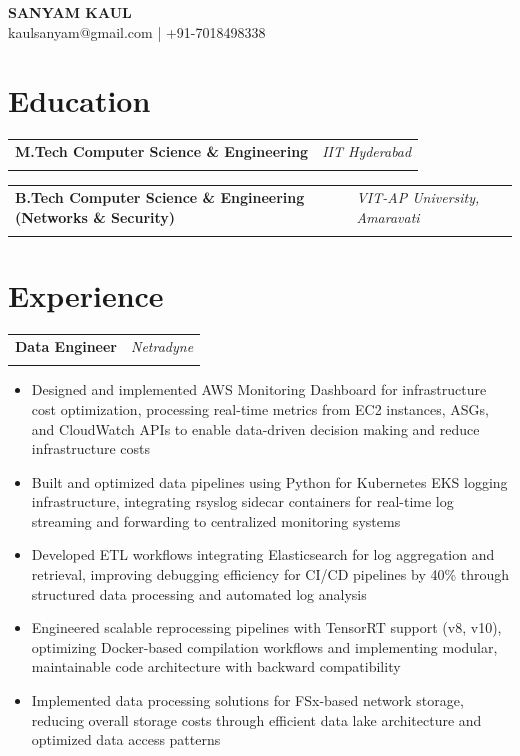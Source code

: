 \documentclass[11pt,a4paper]{article}
\makeatletter
\newcommand{\resumeItem}[1]{\item\small{#1}}
\newlength{\resumeLeftCol}
\newlength{\resumeRightCol}
\newcommand{\resumeHeading}[4]{
  \begin{tabular*}{\textwidth}{@{}p{\resumeLeftCol}@{\extracolsep{\fill}}>{\raggedleft\arraybackslash}p{\resumeRightCol}@{}}
    \textbf{#1} & \textit{#2} \\
    & \textit{\ifstrempty{#4}{#3}{#3 \ #4}}
  \end{tabular*}
  \vspace{-4pt}
}
\makeatother
\begin{document}
\begin{center}
    {\Huge\bfseries SANYAM KAUL} \\
    \vspace{2pt}
    \small kaulsanyam@gmail.com | +91-7018498338
\end{center}

\section{Education}
\resumeHeading{M.Tech Computer Science \& Engineering}{IIT Hyderabad}{2025}{CGPA: 8.90}
\resumeHeading{B.Tech Computer Science \& Engineering (Networks \& Security)}{VIT-AP University, Amaravati}{2021}{CGPA: 8.90}

\section{Experience}
\resumeHeading{Data Engineer}{Netradyne}{July 2025 - Present}{}
\begin{itemize}[leftmargin=*,noitemsep,topsep=0pt]
    \resumeItem{Designed and implemented AWS Monitoring Dashboard for infrastructure cost optimization, processing real-time metrics from EC2 instances, ASGs, and CloudWatch APIs to enable data-driven decision making and reduce infrastructure costs}
    \resumeItem{Built and optimized data pipelines using Python for Kubernetes EKS logging infrastructure, integrating rsyslog sidecar containers for real-time log streaming and forwarding to centralized monitoring systems}
    \resumeItem{Developed ETL workflows integrating Elasticsearch for log aggregation and retrieval, improving debugging efficiency for CI/CD pipelines by 40\% through structured data processing and automated log analysis}
    \resumeItem{Engineered scalable reprocessing pipelines with TensorRT support (v8, v10), optimizing Docker-based compilation workflows and implementing modular, maintainable code architecture with backward compatibility}
    \resumeItem{Implemented data processing solutions for FSx-based network storage, reducing overall storage costs through efficient data lake architecture and optimized data access patterns}
\end{itemize}
\end{document}
